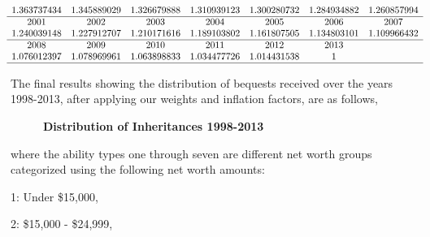 \documentclass[letterpaper,12pt]{article}
\theoremstyle{definition}
\begin{document}
\begin{spacing}{1.5}
\[\begin{matrix}
  1.363737434 & 1.345889029 & 1.326679888 & 1.310939123 & 1.300280732 & 1.284934882 & 1.260857994  \\
  \hline
   2001&2002&  2003&  2004&  2005&  2006 &2007\\

    1.240039148 & 1.227912707 & 1.210171616 & 1.189103802 & 1.161807505 & 1.134803101& 1.109966432  \\
    \hline

      2008&  2009&  2010&  2011&  2012&  2013\\

    1.076012397 & 1.078969961 & 1.063898833 & 1.034477726 & 1.014431538 & 1\\
  \hline

  \end{matrix}\]

  The final results showing the distribution of bequests received over the years 1998-2013, after applying our weights and inflation factors, are as follows,\\
  \begin{figure}[htbp]\centering \captionsetup{width=4.0in}
    \caption{\label{proportions}\textbf{Distribution of Inheritances 1998-2013}}
  \end{figure}

  where the ability types one through seven are different net worth groups categorized using the following net worth amounts:

  1: Under \$15,000,

  2: \$15,000 - \$24,999,


\end{spacing}
\end{document}
